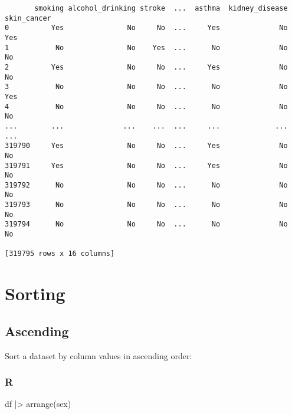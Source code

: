 \documentclass[
  letterpaper,
  DIV=11,
  numbers=noendperiod]{scrreprt}
\newenvironment{Shaded}{\begin{snugshade}}{\end{snugshade}}
\newcommand{\FunctionTok}[1]{\textcolor[rgb]{0.28,0.35,0.67}{#1}}
\newcommand{\NormalTok}[1]{\textcolor[rgb]{0.00,0.46,0.62}{#1}}
\newcommand{\SpecialCharTok}[1]{\textcolor[rgb]{0.37,0.37,0.37}{#1}}
\begin{document}
\begin{verbatim}
       smoking alcohol_drinking stroke  ...  asthma  kidney_disease skin_cancer
0          Yes               No     No  ...     Yes              No         Yes
1           No               No    Yes  ...      No              No          No
2          Yes               No     No  ...     Yes              No          No
3           No               No     No  ...      No              No         Yes
4           No               No     No  ...      No              No          No
...        ...              ...    ...  ...     ...             ...         ...
319790     Yes               No     No  ...     Yes              No          No
319791     Yes               No     No  ...     Yes              No          No
319792      No               No     No  ...      No              No          No
319793      No               No     No  ...      No              No          No
319794      No               No     No  ...      No              No          No

[319795 rows x 16 columns]
\end{verbatim}

\hypertarget{sorting}{%
\section{Sorting}\label{sorting}}

\hypertarget{ascending}{%
\subsection{Ascending}\label{ascending}}

Sort a dataset by column values in ascending order:

\hypertarget{r-23}{%
\subsubsection{R}\label{r-23}}

\begin{Shaded}
\begin{Highlighting}[]
\NormalTok{df }\SpecialCharTok{|\textgreater{}} \FunctionTok{arrange}\NormalTok{(sex)}
\end{Highlighting}
\end{Shaded}
\end{document}
